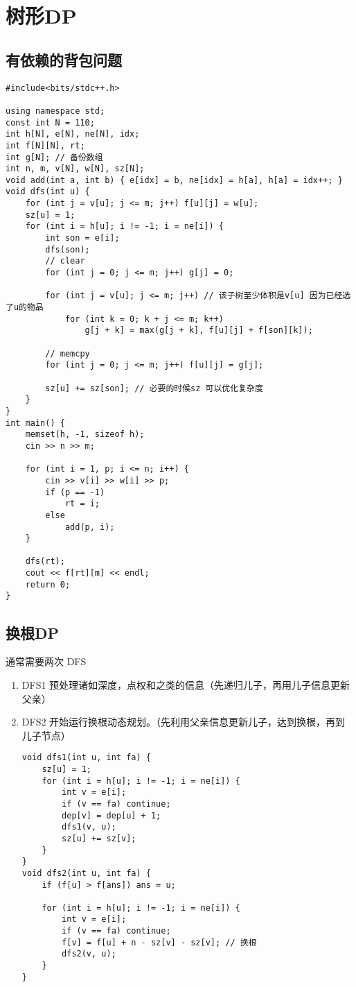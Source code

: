 \section{树形DP}
\subsection{有依赖的背包问题}

\begin{verbatim}
#include<bits/stdc++.h>

using namespace std;
const int N = 110;
int h[N], e[N], ne[N], idx;
int f[N][N], rt;
int g[N]; // 备份数组
int n, m, v[N], w[N], sz[N];
void add(int a, int b) { e[idx] = b, ne[idx] = h[a], h[a] = idx++; }
void dfs(int u) {
    for (int j = v[u]; j <= m; j++) f[u][j] = w[u];
    sz[u] = 1;
    for (int i = h[u]; i != -1; i = ne[i]) {
        int son = e[i];
        dfs(son);
        // clear
        for (int j = 0; j <= m; j++) g[j] = 0;

        for (int j = v[u]; j <= m; j++) // 该子树至少体积是v[u] 因为已经选了u的物品
            for (int k = 0; k + j <= m; k++)
                g[j + k] = max(g[j + k], f[u][j] + f[son][k]);

        // memcpy
        for (int j = 0; j <= m; j++) f[u][j] = g[j];

        sz[u] += sz[son]; // 必要的时候sz 可以优化复杂度 
    }
}
int main() {
    memset(h, -1, sizeof h);
    cin >> n >> m;

    for (int i = 1, p; i <= n; i++) {
        cin >> v[i] >> w[i] >> p;
        if (p == -1)
            rt = i;
        else
            add(p, i);
    }

    dfs(rt);
    cout << f[rt][m] << endl;
    return 0;
}
\end{verbatim}

\subsection{换根DP}


\par \noindent 通常需要两次 DFS
\begin{enumerate}
\item DFS1 预处理诸如深度，点权和之类的信息（先递归儿子，再用儿子信息更新父亲）

\item DFS2 开始运行换根动态规划。（先利用父亲信息更新儿子，达到换根，再到儿子节点）

\begin{verbatim}
void dfs1(int u, int fa) {
    sz[u] = 1;
    for (int i = h[u]; i != -1; i = ne[i]) {
        int v = e[i];
        if (v == fa) continue;
        dep[v] = dep[u] + 1;
        dfs1(v, u);
        sz[u] += sz[v];
    }
}
void dfs2(int u, int fa) {
    if (f[u] > f[ans]) ans = u;

    for (int i = h[u]; i != -1; i = ne[i]) {
        int v = e[i];
        if (v == fa) continue;
        f[v] = f[u] + n - sz[v] - sz[v]; // 换根
        dfs2(v, u);
    }
}
\end{verbatim}
\end{enumerate}